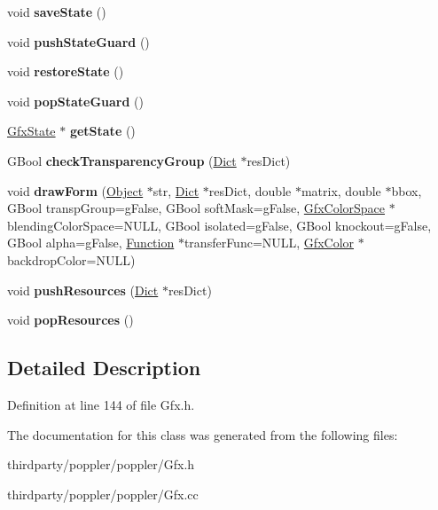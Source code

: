 \begin{DoxyCompactItemize}
\item 
\mbox{\label{class_gfx_a6f4a75528e9ba3b5577405a3c17be6b6}} 
void {\bfseries save\+State} ()
\item 
\mbox{\label{class_gfx_af0f2e630c211379a41f0cd9800c82506}} 
void {\bfseries push\+State\+Guard} ()
\item 
\mbox{\label{class_gfx_ab922dd335721086afee80a7e62327a4e}} 
void {\bfseries restore\+State} ()
\item 
\mbox{\label{class_gfx_a0e95c71bb4e35a2f33141b7b86bec93c}} 
void {\bfseries pop\+State\+Guard} ()
\item 
\mbox{\label{class_gfx_aed84116941871fa57cfc7b022cf578b6}} 
\hyperlink{class_gfx_state}{Gfx\+State} $\ast$ {\bfseries get\+State} ()
\item 
\mbox{\label{class_gfx_a5b1c73329b765909bf8f7d6692f630b6}} 
G\+Bool {\bfseries check\+Transparency\+Group} (\hyperlink{class_dict}{Dict} $\ast$res\+Dict)
\item 
\mbox{\label{class_gfx_a90330ccfb593ecdb2b7cb2e758fa6311}} 
void {\bfseries draw\+Form} (\hyperlink{class_object}{Object} $\ast$str, \hyperlink{class_dict}{Dict} $\ast$res\+Dict, double $\ast$matrix, double $\ast$bbox, G\+Bool transp\+Group=g\+False, G\+Bool soft\+Mask=g\+False, \hyperlink{class_gfx_color_space}{Gfx\+Color\+Space} $\ast$blending\+Color\+Space=N\+U\+LL, G\+Bool isolated=g\+False, G\+Bool knockout=g\+False, G\+Bool alpha=g\+False, \hyperlink{class_function}{Function} $\ast$transfer\+Func=N\+U\+LL, \hyperlink{struct_gfx_color}{Gfx\+Color} $\ast$backdrop\+Color=N\+U\+LL)
\item 
\mbox{\label{class_gfx_ab58563927d5f79d091389f7365c0c1ec}} 
void {\bfseries push\+Resources} (\hyperlink{class_dict}{Dict} $\ast$res\+Dict)
\item 
\mbox{\label{class_gfx_a6f7c99d24d1d60bf199088ceeca6387e}} 
void {\bfseries pop\+Resources} ()
\end{DoxyCompactItemize}


\subsection{Detailed Description}


Definition at line 144 of file Gfx.\+h.



The documentation for this class was generated from the following files\+:\begin{DoxyCompactItemize}
\item 
thirdparty/poppler/poppler/Gfx.\+h\item 
thirdparty/poppler/poppler/Gfx.\+cc\end{DoxyCompactItemize}
